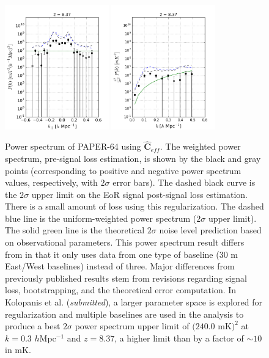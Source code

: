 \documentclass[preprint2,numberedappendix,tighten]{aastex6}  %
\begin{document}
\begin{figure}
	\centering
	\includegraphics[width=0.4\textwidth]{plots/ps1_data_add.png}
	\includegraphics[width=0.4\textwidth]{plots/ps2_data_add.png}
	\caption{Power spectrum of PAPER-64 using $\widehat{\textbf{C}}_{eff}$. The weighted power spectrum, pre-signal loss estimation, is shown by the black and gray points (corresponding to positive and 
negative power spectrum values, respectively, with $2\sigma$ error bars). The dashed black curve is the $2\sigma$ upper limit on the EoR signal post-signal loss estimation. There is a small amount of loss using this regularization. The dashed blue line is the uniform-weighted 
power spectrum ($2\sigma$ upper limit). The solid green line is the theoretical $2\sigma$ noise level prediction based on 
observational parameters. This power spectrum result differs from  in that it only uses data from one type of baseline ($30$ m 
East/West baselines) instead of three. Major differences from previously published results stem from revisions regarding signal 
loss, bootstrapping, and the theoretical error computation. In Kolopanis et al. (\textit{submitted}), a larger parameter space is explored for regularization and multiple baselines are used in the analysis to produce a best $2\sigma$ power spectrum upper limit of $(240.0$ mK$)^{2}$ at $k=0.3$ $h$Mpc$^{-1}$ and $z=8.37$, 
a higher limit than  by a factor of $\sim$$10$ in mK.}
	\label{fig:ps1_data}
\end{figure}
\end{document}

